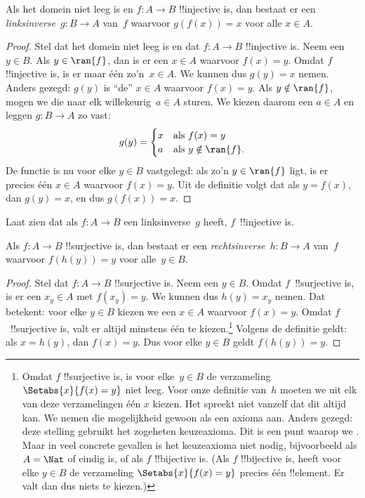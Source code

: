 \documentclass[../../../include/open-logic-section]{subfiles}
\begin{document}
\begin{prop}
Als het domein niet leeg is en $f\colon A \to B$ !!{injective} is, dan
bestaat er een
\emph{linksinverse}~$g\colon B \to A$ van~$f$ waarvoor $g(f(x)) = x$
voor alle $x \in A$.
\end{prop}

\begin{proof}
Stel dat het domein niet leeg is en dat $f\colon A \to B$
!!{injective} is. Neem een $y \in B$. Als
$y \in \ran{f}$, dan is er een $x \in A$ waarvoor $f(x) = y$. Omdat
$f$ !!{injective} is, is er maar één zo'n~$x \in A$. We kunnen dus
$g(y) = x$ nemen. Anders gezegd: $g(y)$ is ``de'' $x \in A$ waarvoor
$f(x) = y$. Als $y \notin \ran{f}$, mogen we die naar elk
willekeurig~$a \in A$ sturen. We kiezen daarom een $a \in A$ en leggen
$g\colon B \to A$ zo vast:
\[
g(y) = \begin{cases}
    x & \text{als $f(x) = y$}\\
    a & \text{als $y \notin \ran{f}$.}
\end{cases}
\]
De functie is nu voor elke $y \in B$ vastgelegd: als zo'n $y \in \ran{f}$
ligt, is er precies één $x \in A$ waarvoor $f(x) = y$. Uit de
definitie volgt dat als $y = f(x)$, dan $g(y) = x$, en dus
$g(f(x)) = x$.
\end{proof}

\begin{prob}
Laat zien dat als $f\colon A \to B$ een linksinverse~$g$ heeft,
$f$~!!{injective} is.
\end{prob}

\begin{prop}
    Als $f\colon A \to B$ !!{surjective} is, dan bestaat er een
    \emph{rechtsinverse}~$h\colon B \to A$ van~$f$ waarvoor $f(h(y)) =
    y$ voor alle~$y \in B$.
\end{prop}

\begin{proof}
Stel dat $f\colon A \to B$ !!{surjective} is. Neem een $y \in B$.
Omdat $f$~!!{surjective} is, is er een $x_y \in A$ met $f(x_y) = y$.
We kunnen dus $h(y) = x_y$ nemen. Dat betekent: voor elke $y \in B$
kiezen we een $x \in A$ waarvoor $f(x) = y$. Omdat $f$~!!{surjective}
is, valt er altijd minstens één te kiezen.\footnote{Omdat $f$
!!{surjective} is, is voor elke~$y \in B$ de verzameling
$\Setabs{x}{f(x) = y}$ niet leeg. Voor onze definitie van~$h$ moeten
we uit elk van deze verzamelingen één $x$ kiezen. Het spreekt niet
vanzelf dat dit altijd kan. We nemen die mogelijkheid gewoon als een
axioma aan. Anders gezegd: deze stelling gebruikt het zogeheten
keuzeaxioma. Dit is een punt waarop we
.
Maar in veel concrete gevallen is het keuzeaxioma niet nodig,
bijvoorbeeld als $A = \Nat$ of eindig is, of als $f$ !!{bijective} is.
(Als $f$ !!{bijective} is, heeft voor elke $y \in B$ de verzameling
$\Setabs{x}{f(x) = y}$ precies één !!{element}.
Er valt dan dus niets te kiezen.)}
Volgens de definitie geldt: als $x = h(y)$, dan $f(x) = y$. Dus voor
elke $y \in B$ geldt $f(h(y)) = y$.
\end{proof}
\end{document}
